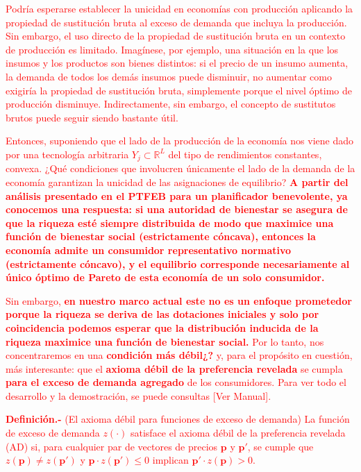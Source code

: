\documentclass[10pt,a4paper]{article}
\newcommand{\authorfont}[1]{{\fontfamily{EBGaramond-TLF}\selectfont #1}}
\begin{document}
            \textcolor{red}{Podría esperarse establecer la unicidad en economías con producción aplicando la propiedad de sustitución bruta al exceso de demanda que incluya la producción. Sin embargo, el uso directo de la propiedad de sustitución bruta en un contexto de producción es limitado. Imagínese, por ejemplo, una situación en la que los insumos y los productos son bienes distintos: si el precio de un insumo aumenta, la demanda de todos los demás insumos puede disminuir, no aumentar como exigiría la propiedad de sustitución bruta, simplemente porque el nivel óptimo de producción disminuye. Indirectamente, sin embargo, el concepto de sustitutos brutos puede seguir siendo bastante útil.
            
            Entonces, suponiendo que el lado de la producción de la economía nos viene dado por una tecnología arbitraria $Y_j \subset \mathbb{R}^L$ del tipo de rendimientos constantes, convexa. ¿Qué condiciones que involucren únicamente el lado de la demanda de la economía garantizan la unicidad de las asignaciones de equilibrio? \textbf{A partir del análisis presentado en el PTFEB para un planificador benevolente, ya conocemos una respuesta: si una autoridad de bienestar se asegura de que la riqueza esté siempre distribuida de modo que maximice una función de bienestar social (estrictamente cóncava), entonces la economía admite un consumidor representativo normativo (estrictamente cóncavo), y el equilibrio corresponde necesariamente al único óptimo de Pareto de esta economía de un solo consumidor.} 
            
            Sin embargo, \textbf{en nuestro marco actual este no es un enfoque prometedor porque la riqueza se deriva de las dotaciones iniciales y solo por coincidencia podemos esperar que la distribución inducida de la riqueza maximice una función de bienestar social.} Por lo tanto, nos concentraremos en una \textbf{condición más débil¿?} y, para el propósito en cuestión, más interesante: que el \textbf{axioma débil de la preferencia revelada} se cumpla \textbf{para el exceso de demanda agregado} de los consumidores. Para ver todo el desarrollo y la demostración, se puede consultas [\authorfont{Ver Manual}].

            \textbf{Definición.-} (El axioma débil para funciones de exceso de demanda) La función de exceso de demanda $z(\cdot)$ satisface el axioma débil de la preferencia revelada (AD) si, para cualquier par de vectores de precios $\mathbf p$ y $\mathbf p'$, se cumple que
            $z(\mathbf p)\neq z(\mathbf p')$ y $\mathbf p\cdot z(\mathbf p')\leq 0$ implican $\mathbf p'\cdot z(\mathbf p)>0$.
            
}
\end{document}
